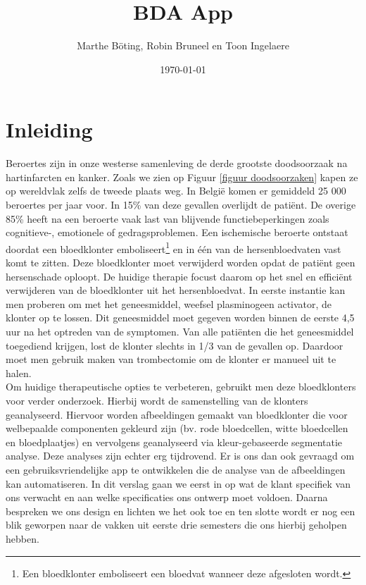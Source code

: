 \documentclass[a4paper,kulak]{kulakarticle}
\date{\today}
\title{BDA App}
\author{Marthe B\"{o}ting,	Robin Bruneel en Toon Ingelaere}
\begin{document}
	
	
	\maketitle

\section*{Inleiding}
Beroertes zijn in onze westerse samenleving de derde grootste doodsoorzaak na hartinfarcten en kanker. Zoals we zien op Figuur \ref{figuur doodsoorzaken} kapen ze op wereldvlak zelfs de tweede plaats weg\cite{worldhealthorganization}. In België komen er gemiddeld 25 000 beroertes per jaar voor. In 15\% van deze gevallen overlijdt de patiënt. De overige 85\% heeft na een beroerte vaak last van blijvende functiebeperkingen zoals cognitieve-, emotionele of gedragsproblemen. Een ischemische beroerte ontstaat doordat een bloedklonter emboliseert\footnote{Een bloedklonter emboliseert een bloedvat wanneer deze afgesloten wordt.} en in één van de hersenbloedvaten vast komt te zitten. Deze bloedklonter moet verwijderd worden opdat de patiënt geen hersenschade oploopt.
De huidige therapie focust daarom op het snel en efficiënt verwijderen van de bloedklonter uit het hersenbloedvat. In eerste instantie kan men proberen om met het geneesmiddel, weefsel plasminogeen activator, de klonter op te lossen. Dit geneesmiddel moet gegeven worden binnen de eerste 4,5 uur na het optreden van de symptomen. Van alle patiënten die het geneesmiddel toegediend krijgen, lost de klonter slechts in 1/3 van de gevallen op. Daardoor moet men gebruik maken van trombectomie om de klonter er manueel uit te halen.\\
Om huidige therapeutische opties te verbeteren, gebruikt men deze bloedklonters voor verder onderzoek. Hierbij wordt de samenstelling van de klonters geanalyseerd. Hiervoor worden afbeeldingen gemaakt van bloedklonter die voor welbepaalde componenten gekleurd zijn (bv. rode bloedcellen, witte bloedcellen en bloedplaatjes) en vervolgens geanalyseerd via kleur-gebaseerde segmentatie analyse. 
Deze analyses zijn echter erg tijdrovend. Er is ons dan ook gevraagd om een gebruiksvriendelijke app te ontwikkelen die de analyse van de afbeeldingen kan automatiseren.
In dit verslag gaan we eerst in op wat de klant specifiek van ons verwacht en aan welke specificaties ons ontwerp moet voldoen. Daarna bespreken we ons design en lichten we het ook toe en ten slotte wordt er nog een blik geworpen naar de vakken uit eerste drie semesters die ons hierbij geholpen hebben.
\end{document}
